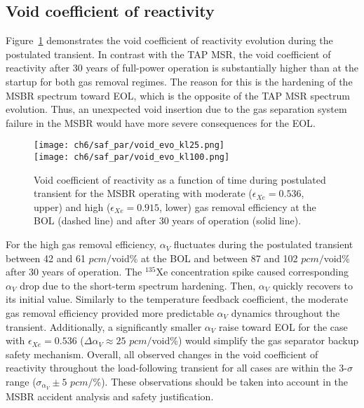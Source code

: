 \subsection{Void coefficient of reactivity}
Figure~\ref{fig:msbr-lf-void-evo} demonstrates the void coefficient of 
reactivity evolution during the postulated transient. 
In contrast with the \gls{TAP} \gls{MSR}, the void coefficient of reactivity 
after 30 years of full-power operation is substantially higher than at the 
startup for both gas removal regimes. The reason for this is the hardening of 
the \gls{MSBR} spectrum toward \gls{EOL}, which is the opposite of the 
\gls{TAP} \gls{MSR} spectrum evolution. Thus, an unexpected void insertion due 
to the gas separation system failure in the \gls{MSBR} would have more severe 
consequences for the \gls{EOL}. 
\begin{figure}[htbp!] %
	\centering
	\texttt{[image: ch6/saf\_par/void\_evo\_kl25.png]}\\
	\vspace{-12mm}
	\hspace{+0.05mm}
	\texttt{[image: ch6/saf\_par/void\_evo\_kl100.png]}
	\vspace{-3mm}
	\caption{Void coefficient of reactivity as a function of time during 
	postulated transient
for the \gls{MSBR} operating with moderate 
	($\epsilon_{Xe}=0.536$, upper) and high ($\epsilon_{Xe}=0.915$, lower) gas 
	removal efficiency at the \gls{BOL} (dashed line) and after 30 years of 
	operation (solid line).}
	\label{fig:msbr-lf-void-evo}
\end{figure}

For the high gas removal efficiency, $\alpha_V$ fluctuates during the 
postulated transient between 42 and 61 $pcm/$void\% at the \gls{BOL} and 
between 87 and 102 $pcm/$void\% after 30 years of operation. The $^{135}$Xe 
concentration spike caused corresponding $\alpha_V$ drop due to the short-term 
spectrum hardening. Then, $\alpha_V$ quickly recovers to its initial value. 
Similarly to the temperature feedback coefficient, the moderate gas removal 
efficiency provided more predictable $\alpha_V$ dynamics throughout the 
transient. Additionally, a significantly smaller $\alpha_V$ raise toward 
\gls{EOL} for the case with $\epsilon_{Xe}=0.536$ ($\Delta\alpha_V\approx25$ 
$pcm/$void\%) would simplify the gas separator backup safety mechanism. 
Overall, all observed changes in the void coefficient of reactivity throughout 
the load-following transient for all cases are within the 3-$\sigma$ range 
($\sigma_{\alpha_V}\pm5$ $pcm/$\%). These observations should be taken 
into account in the \gls{MSBR} accident analysis and safety
justification.

